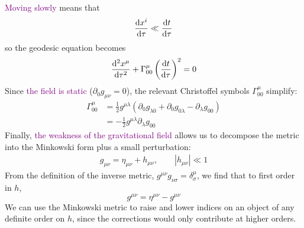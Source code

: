 \textcolor{purple}{Moving slowly} means that
\begin{equation*}
    \dv{x^{i}}{\tau}\ll \dv{t}{\tau}
\end{equation*}
so the geodesic equation becomes
\begin{equation}\label{4.10}
    \dv[2]{x^\mu}{\tau}+\Gamma^\mu_{00}\left(\dv{t}{\tau}\right)^2=0
\end{equation}
Since \textcolor{purple}{the field is static} ($\partial_0 g_{\mu\nu}=0$), the relevant Christoffel symbols $\Gamma^\mu_{00}$ simplify:
\begin{align*}
    \Gamma^\mu_{00}&=\frac{1}{2}g^{\mu\lambda}(\partial_0 g_{\lambda 0}+\partial_0 g_{0\lambda} -\partial_\lambda g_{00})\\
    &=-\frac{1}{2}g^{\mu\lambda}\partial_\lambda g_{00}
\end{align*}
Finally, \textcolor{purple}{the weakness of the gravitational field} allows us to decompose the metric into the Minkowski form plus a small perturbation:
\begin{align}\label{4.12}
    g_{\mu\nu}=\eta_{\mu\nu}+h_{\mu\nu},\qquad |h_{\mu\nu}|\ll 1
\end{align}
From the definition of the inverse metric, $g^{\mu\nu}g_{\nu\sigma}=\delta^\mu_\sigma$, we find that to first order in $h$,
\begin{equation}\label{4.13}
    g^{\mu\nu}=\eta^{\mu\nu}-g^{\mu\nu}
\end{equation}
We can use the Minkowski metric to raise and lower indices on an object of any definite order on $h$, since the corrections would only contribute at higher orders.

